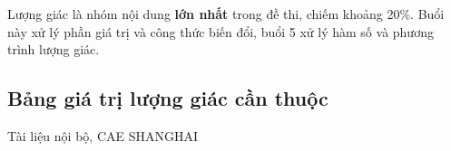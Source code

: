 \documentclass[11pt, a4paper]{article}
\begin{document}
Lượng giác là nhóm nội dung \textbf{lớn nhất} trong đề thi, chiếm khoảng 20\%. Buổi này xử lý phần giá trị và công thức biến đổi, buổi 5 xử lý hàm số và phương trình lượng giác.

\subsection{Bảng giá trị lượng giác cần thuộc}

\vspace{0.8cm}
\begin{center}
{\footnotesize\color{cae_blue} Tài liệu nội bộ, CAE SHANGHAI}
\end{center}
\end{document}
